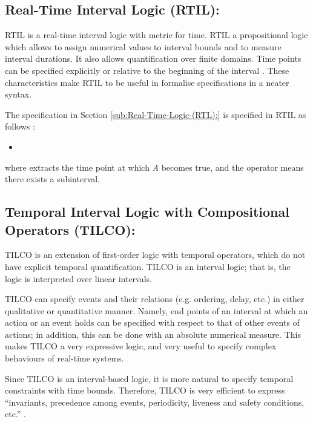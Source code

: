 \documentclass[11pt]{article}
\begin{document}
\subsection{Real-Time Interval Logic (RTIL): }

RTIL \cite{RG89} is a real-time interval logic with metric for time.  RTIL a propositional logic which allows to assign numerical values to interval bounds and to measure interval durations.  It also allows quantification over finite domains. Time points can be specified explicitly or relative to the beginning of the interval  \cite{BMN00}. These characteristics make RTIL to be useful in formalise specifications in a neater syntax. 

The specification in Section \ref{sub:Real-Time-Logic-(RTL):} is specified in RTIL as follows \cite{BMN00}:

\begin{itemize}
\item 
\end{itemize}

\noindent where  extracts the time point at which \emph{A} becomes true, and the operator means there exists a subinterval.


















\subsection{Temporal Interval Logic with Compositional Operators (TILCO):}

TILCO \cite{Mat96,MN96} is an extension of first-order logic with temporal operators, which do not have explicit temporal quantification. TILCO is an interval logic; that is, the logic is interpreted over linear intervals.   

TILCO can specify events and their relations (e.g. ordering, delay, etc.) in either qualitative or quantitative manner. Namely, end points of an interval at which an action or an event holds can be specified with respect to that of other events of actions; in addition, this can be done with an absolute numerical measure.  This makes TILCO a very expressive logic, and very useful to specify complex behaviours of real-time systems. 

Since TILCO is an interval-based logic, it is more natural to specify temporal constraints with time bounds.  Therefore, TILCO is very efficient to express ``invariants, precedence among events, periodicity, liveness and safety conditions, etc.'' \cite{BMN00}. 
\end{document}
